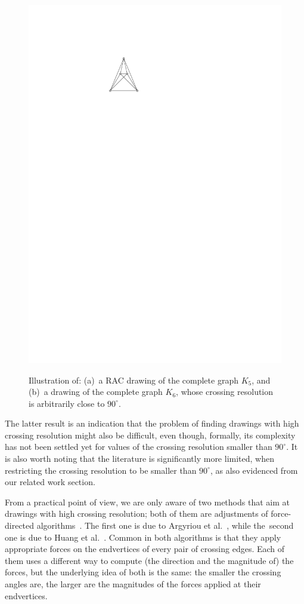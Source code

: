 \documentclass{comjnl}
\begin{document}
\begin{figure}[t!]
{	\includegraphics[page=2]{figures/examples}}
	\caption{Illustration of: %
	(a)~a RAC drawing of the complete graph $K_5$, and
	(b)~a drawing of the complete graph $K_6$, whose crossing resolution is arbitrarily close to $90^\circ$.}
	\label{fig:examples}
\end{figure}

The latter result is an indication that the problem of finding drawings with high crossing resolution might also be difficult, even though, formally, its complexity has not been settled yet for values of the crossing resolution smaller than $90^\circ$. It is also worth noting that the literature is significantly more limited, when restricting the crossing resolution to be smaller than $90^\circ$, as also evidenced from our related work section.

From a practical point of view, we are only aware of two methods that aim at drawings with high crossing resolution; both of them are adjustments of force-directed algorithms~\cite{DBLP:journals/congnum/Eades84}. The first one is due to Argyriou et al.~\cite{DBLP:journals/cj/ArgyriouBS13}, while the~second one is due to Huang et al.~\cite{DBLP:journals/vlc/HuangEHL13}. Common in both algorithms is that they apply appropriate forces on the endvertices of every pair of crossing edges. Each of them uses a different way to compute (the direction and the magnitude of) the forces, but the underlying idea of both is the same: the smaller the crossing angles are, the larger are the magnitudes of the forces applied at their endvertices.
\end{document}
